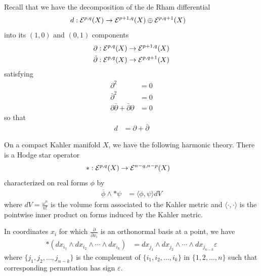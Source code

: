 \documentclass[12pt]{article}
\begin{document}
Recall that we have the decomposition of the de Rham differential \begin{align*}
    d: {\mathcal{E}}^{p,q}(X) & \to {\mathcal{E}}^{p+1,q}(X) \oplus {\mathcal{E}}^{p,q+1}(X)
\end{align*} into its $(1,0)$ and $(0,1)$ components \begin{align*}
    \partial & : {\mathcal{E}}^{p,q}(X) \to {\mathcal{E}}^{p+1,q}(X) \\
    \bar{\partial} & : {\mathcal{E}}^{p,q}(X) \to {\mathcal{E}}^{p,q+1}(X)
\end{align*} satisfying \begin{align*}
    \partial^2 & = 0 \\
    \bar{\partial}^2 & = 0 \\
    \partial \bar{\partial} + \bar{\partial} \partial & = 0
\end{align*} so that \begin{align*} 
    d & = \partial + \bar{\partial}
\end{align*} 

On a compact Kahler manifold $X$, we have the following harmonic theory. There is a Hodge star operator \begin{align*}
    *: {\mathcal{E}}^{p,q}(X) & \to {\mathcal{E}}^{n-q, n-p}(X)
\end{align*} characterized on real forms $\phi$ by \begin{align*}
    \overline{\phi} \wedge * \psi & = \langle \phi, \psi \rangle dV
\end{align*} where $dV = \frac{\omega^n}{n!}$ is the volume form associated to the Kahler metric and $\langle \cdot, \cdot \rangle$ is the pointwise inner product on forms induced by the Kahler metric.

In coordinates $x_i$ for which $\frac{\partial}{\partial x_i}$ is an orthonormal basis at a point, we have \begin{align*}
    *(d x_{i_1} \wedge d x_{i_2} \wedge \cdots \wedge d x_{i_k}) & = d x_{j_1} \wedge d x_{j_2} \wedge \cdots \wedge d x_{j_{n-k}} \varepsilon
\end{align*} where $\{ j_1, j_2, \ldots, j_{n-k} \}$ is the complement of $\{ i_1, i_2, \ldots, i_k \}$ in $\{ 1, 2, \ldots, n \}$ such that corresponding permutation has sign $\varepsilon$.
\end{document}
